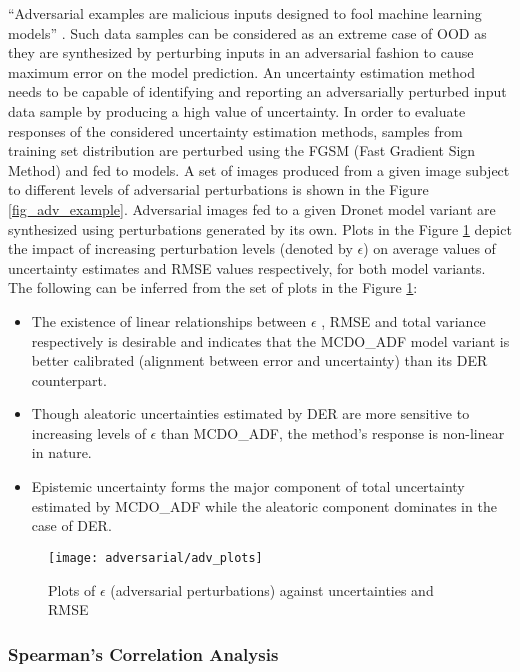 \enquote{Adversarial examples are malicious inputs designed to fool machine learning models} \cite{kurakin2016adversarial}. Such data samples can be considered as an extreme case of OOD as they are synthesized by perturbing inputs in an adversarial fashion to cause maximum error on the model prediction. An uncertainty estimation method needs to be capable of identifying and reporting an adversarially perturbed input data sample by producing a high value of uncertainty. 
In order to evaluate responses of the considered uncertainty estimation methods, samples from training set distribution are perturbed using the FGSM (Fast Gradient Sign Method) \cite{goodfellow2015explaining} and fed to models. A set of images produced from a given image subject to different levels of adversarial perturbations is shown in the Figure \ref{fig_adv_example}. Adversarial images fed to a given Dronet model variant are synthesized using perturbations generated by its own.  
Plots in the Figure \ref{fig_adv_analysis} depict the impact of increasing perturbation levels (denoted by $\epsilon$) on average values of uncertainty estimates and RMSE values respectively, for both model variants. The following can be inferred from the set of plots in the Figure \ref{fig_adv_analysis}:
\begin{itemize}
	\item The existence of linear relationships between $\epsilon$ , RMSE and total variance respectively is desirable and indicates that the MCDO\_ADF model variant is better calibrated (alignment between error and uncertainty) than its DER counterpart.
	\item  Though aleatoric uncertainties estimated by DER are more sensitive to increasing levels of $\epsilon$ than MCDO\_ADF, the method's response is non-linear in nature.
	\item  Epistemic uncertainty forms the major component of total uncertainty estimated by MCDO\_ADF while the aleatoric component dominates in the case of DER.
\end{itemize}
\begin{figure}[H]
	\centering
	\texttt{[image: adversarial/adv\_plots]}
	\caption{Plots of $\epsilon$ (adversarial perturbations) against uncertainties and RMSE}
	\label{fig_adv_analysis}
\end{figure}
\subsubsection{Spearman's Correlation Analysis}

